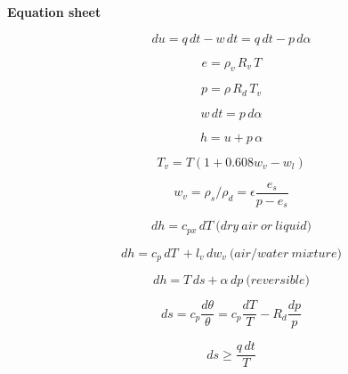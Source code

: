 \documentclass[12pt]{article}
\begin{document}
\newpage
\begin{center}
  \textbf{Equation sheet}
\end{center}

\begin{multicols}{2}

  \begin{equation}
\label{eq:first}
du = q\,dt - w\,dt = q\,dt - p\,d\alpha
  \end{equation}

\begin{equation}
e = \rho_v\, R_v\, T
\end{equation}

\begin{equation}
p = \rho\, R_d\, T_v
\end{equation}


\begin{equation}
w \,dt = p\,d\alpha
\end{equation}

\begin{equation}
h = u + p \,\alpha
\end{equation}

\begin{equation}
  \label{eq:tv}
  T_v = T(1 + 0.608 w_v - w_l)
\end{equation}

\begin{equation}
  \label{eq:wv}
  w_v = \rho_s/\rho_d = \epsilon \frac{e_s}{p - e_s}
\end{equation}

\begin{equation}
dh = c_{px}\, dT\ \mathrm(dry\ air\ or\ liquid)
\end{equation}

\begin{equation}
dh = c_p\, dT\ + l_v\,dw_v\ \mathrm(air/water\ mixture)
\end{equation}


\begin{equation}
dh = T\,ds + \alpha\,dp\ \mathrm(reversible)
\end{equation}

\begin{equation}
ds = c_p \frac{d\theta}{\theta} = c_p \frac{dT}{T} - R_d \frac{dp}{p}
\end{equation}

\begin{equation}
  \label{eq:ds}
  ds \geq \frac{q\,dt}{T}
\end{equation}


\end{multicols}
\end{document}
